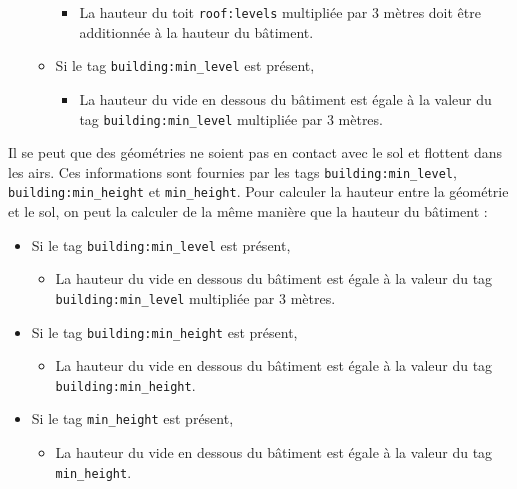 \begin{itemize}
\begin{itemize}
                    \begin{itemize}
                        \item La hauteur du toit \texttt{roof:levels} multipliée par 3 mètres doit être additionnée à la hauteur du bâtiment.
                    \end{itemize}
              \item Si le tag \texttt{building:min\_level} est présent,
                    \begin{itemize}
                        \item La hauteur du vide en dessous du bâtiment est égale à la valeur du tag \texttt{building:min\_level} multipliée par 3 mètres.
                    \end{itemize}
          \end{itemize}
\end{itemize}

Il se peut que des géométries ne soient pas en contact avec le sol et flottent dans les airs. Ces informations sont fournies par les tags \texttt{building:min\_level}, \texttt{building:min\_height} et \texttt{min\_height}. Pour calculer la hauteur entre la géométrie et le sol, on peut la calculer de la même manière que la hauteur du bâtiment :

\begin{itemize}
    \item Si le tag \texttt{building:min\_level} est présent,
        \begin{itemize}
            \item La hauteur du vide en dessous du bâtiment est égale à la valeur du tag \texttt{building:min\_level} multipliée par 3 mètres.
        \end{itemize}
    \item Si le tag \texttt{building:min\_height} est présent,
        \begin{itemize}
            \item La hauteur du vide en dessous du bâtiment est égale à la valeur du tag \texttt{building:min\_height}.
        \end{itemize}
    \item Si le tag \texttt{min\_height} est présent,
        \begin{itemize}
            \item La hauteur du vide en dessous du bâtiment est égale à la valeur du tag \texttt{min\_height}.
        \end{itemize}
\end{itemize}

